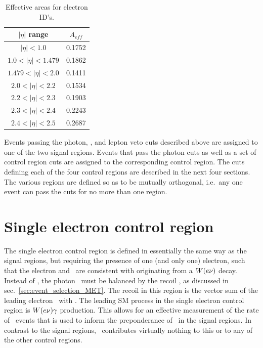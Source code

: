 \begin{table}
\centering
\begin{tabular}{ cc }
\hline
$|\eta|$ range & $A_{eff}$ \\
\hline
$|\eta| < 1.0$ & 0.1752 \\
$1.0 < |\eta| < 1.479$ & 0.1862 \\
$1.479 < |\eta| < 2.0$ & 0.1411 \\
$2.0 < |\eta| < 2.2$ & 0.1534 \\
$2.2 < |\eta| < 2.3$ & 0.1903 \\
$2.3 < |\eta| < 2.4$ & 0.2243 \\
$2.4 < |\eta| < 2.5$ & 0.2687 \\
\hline
\end{tabular}
\caption{Effective areas for electron ID's.}
\label{tab:electron_effective_areas}
\end{table}

Events passing the photon, \MET, and lepton veto cuts described above are assigned to one of the two signal regions. Events that pass the photon
cuts as well as a set of control region cuts are assigned to the corresponding control region. The cuts defining each of the four control regions
are described in the next four sections. The various regions are defined so as to be mutually orthogonal, i.e.\ any one event can pass the cuts
for no more than one region.

\section{Single electron control region} \label{sec:event_selection_monoele}
The single electron control region is defined in essentially the same way as the signal regions, but requiring the presence of one (and only one) electron,
such that the electron and \vecMET\ are consistent with originating from a $W(e\nu)$ decay.
Instead of \vecMET, the photon \vecpT\ must be balanced by the recoil \vecrecoil, as discussed in sec.~\ref{sec:event_selection_MET}. The recoil in this
region is the vector sum of the leading electron \pT\ with \vecMET.
The leading SM process in the single electron control region is $W(e\nu)\gamma$ production. This allows for an effective measurement of the rate of \wlng\ events
that is used to inform the preponderance of \wlng\ in the signal regions. In contrast to the signal regions, \zinvg\ contributes
virtually nothing to this or to any of the other control regions.

